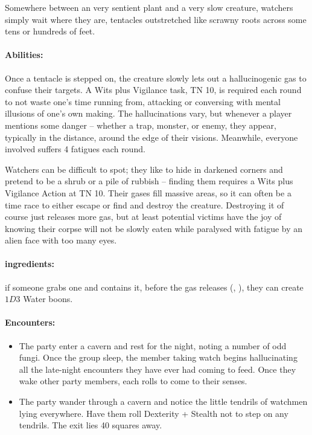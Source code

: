 \begin{multicols}{2}
\begin{itemize}
\end{itemize}

\umberhulk

\label{watcher}

Somewhere between an very sentient plant and a very slow creature, watchers simply wait where they are, tentacles outstretched like scrawny roots across some tens or hundreds of feet.

\paragraph{Abilities:} Once a tentacle is stepped on, the creature slowly lets out a hallucinogenic gas to confuse their targets.
A Wits plus Vigilance task, TN 10, is required each round to not waste one's time running from, attacking or conversing with mental illusions of one's own making.
The hallucinations vary, but whenever a player mentions some danger -- whether a trap, monster, or enemy, they appear, typically in the distance, around the edge of their visions.
Meanwhile, everyone involved suffers 4 \glspl{fatigue} each round.

Watchers can be difficult to spot; they like to hide in darkened corners and pretend to be a shrub or a pile of rubbish -- finding them requires a Wits plus Vigilance Action at TN 10.
Their gases fill massive areas, so it can often be a time race to either escape or find and destroy the creature.
Destroying it of course just releases more gas, but at least potential victims have the joy of knowing their corpse will not be slowly eaten while paralysed with fatigue by an alien face with too many eyes.


\watcher

\paragraph{\Glspl{ingredient}:}
if someone grabs one and contains it, before the gas releases (, \tn[10]), they can create $1D3$ Water \glspl{boon}.

\paragraph{Encounters:}

\begin{itemize}

  \item
  The party enter a cavern and rest for the night, noting a number of odd fungi.
  Once the group sleep, the member taking watch begins hallucinating all the late-night encounters they have ever had coming to feed.
  Once they wake other party members, each rolls to come to their senses.
  \item
  The party wander through a cavern and notice the little tendrils of watchmen lying everywhere.
  Have them roll Dexterity + Stealth not to step on any tendrils.
  The exit lies 40 squares away.

\end{itemize}

\end{multicols}

